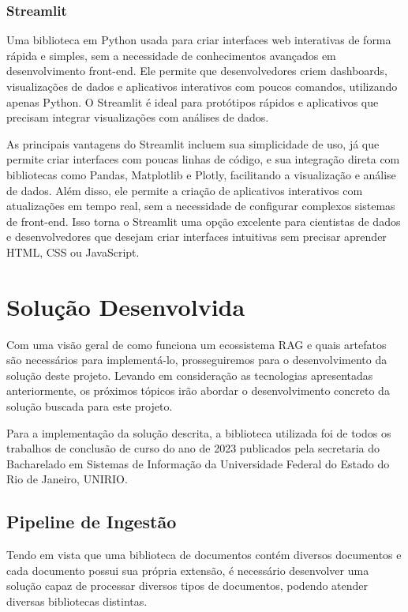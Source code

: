 \documentclass[a4paper, 12pt]{article}
\begin{document}
    \subsubsection{Streamlit}
    Uma biblioteca em Python usada para criar interfaces web interativas de forma rápida e simples, sem a necessidade de conhecimentos avançados em desenvolvimento front-end. Ele permite que desenvolvedores criem dashboards, visualizações de dados e aplicativos interativos com poucos comandos, utilizando apenas Python. O Streamlit é ideal para protótipos rápidos e aplicativos que precisam integrar visualizações com análises de dados.

    As principais vantagens do Streamlit incluem sua simplicidade de uso, já que permite criar interfaces com poucas linhas de código, e sua integração direta com bibliotecas como Pandas, Matplotlib e Plotly, facilitando a visualização e análise de dados. Além disso, ele permite a criação de aplicativos interativos com atualizações em tempo real, sem a necessidade de configurar complexos sistemas de front-end. Isso torna o Streamlit uma opção excelente para cientistas de dados e desenvolvedores que desejam criar interfaces intuitivas sem precisar aprender HTML, CSS ou JavaScript.

    \clearpage

    \section{Solução Desenvolvida}

    Com uma visão geral de como funciona um ecossistema RAG e quais artefatos são necessários para implementá-lo, prosseguiremos para o desenvolvimento da solução deste projeto. Levando em consideração as tecnologias apresentadas anteriormente, os próximos tópicos irão abordar o desenvolvimento concreto da solução buscada para este projeto.

    Para a implementação da solução descrita, a biblioteca utilizada foi de todos os trabalhos de conclusão de curso do ano de 2023 publicados pela secretaria do Bacharelado em Sistemas de Informação da Universidade Federal do Estado do Rio de Janeiro, UNIRIO.

    \subsection{Pipeline de Ingestão}
    
    Tendo em vista que uma biblioteca de documentos contém diversos documentos e cada documento possui sua própria extensão, é necessário desenvolver uma solução capaz de processar diversos tipos de documentos, podendo atender diversas bibliotecas distintas.
\end{document}
